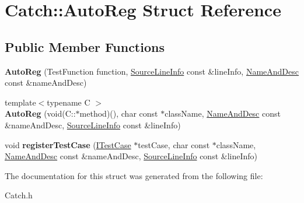 \hypertarget{struct_catch_1_1_auto_reg}{\section{Catch\-:\-:Auto\-Reg Struct Reference}
\label{struct_catch_1_1_auto_reg}
}
\subsection*{Public Member Functions}
\begin{DoxyCompactItemize}
\item 
\hypertarget{struct_catch_1_1_auto_reg_af224f4568d57b8652474df475a164a8c}{{\bfseries Auto\-Reg} (Test\-Function function, \hyperlink{struct_catch_1_1_source_line_info}{Source\-Line\-Info} const \&line\-Info, \hyperlink{struct_catch_1_1_name_and_desc}{Name\-And\-Desc} const \&name\-And\-Desc)}\label{struct_catch_1_1_auto_reg_af224f4568d57b8652474df475a164a8c}

\item 
\hypertarget{struct_catch_1_1_auto_reg_a1bf9207fe0a02b46dc0ab1cc03cbe738}{{\footnotesize template$<$typename C $>$ }\\{\bfseries Auto\-Reg} (void(C\-::$\ast$method)(), char const $\ast$class\-Name, \hyperlink{struct_catch_1_1_name_and_desc}{Name\-And\-Desc} const \&name\-And\-Desc, \hyperlink{struct_catch_1_1_source_line_info}{Source\-Line\-Info} const \&line\-Info)}\label{struct_catch_1_1_auto_reg_a1bf9207fe0a02b46dc0ab1cc03cbe738}

\item 
\hypertarget{struct_catch_1_1_auto_reg_a2dc6a03e838b31e29fcd6a740195b55b}{void {\bfseries register\-Test\-Case} (\hyperlink{struct_catch_1_1_i_test_case}{I\-Test\-Case} $\ast$test\-Case, char const $\ast$class\-Name, \hyperlink{struct_catch_1_1_name_and_desc}{Name\-And\-Desc} const \&name\-And\-Desc, \hyperlink{struct_catch_1_1_source_line_info}{Source\-Line\-Info} const \&line\-Info)}\label{struct_catch_1_1_auto_reg_a2dc6a03e838b31e29fcd6a740195b55b}

\end{DoxyCompactItemize}


The documentation for this struct was generated from the following file\-:\begin{DoxyCompactItemize}
\item 
Catch.\-h\end{DoxyCompactItemize}
